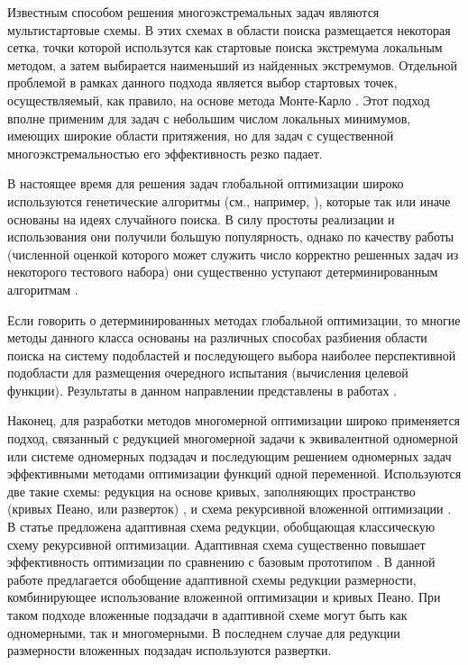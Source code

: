 \documentclass[runningheads]{llncs}
\begin{document}
\Russian
Известным способом решения многоэкстремальных задач являются мультистартовые схемы. В этих схемах в области поиска размещается некоторая сетка, точки которой использутся как стартовые поиска экстремума локальным методом, а затем выбирается наименьший из найденных экстремумов. Отдельной проблемой в рамках данного подхода является выбор стартовых точек, осуществляемый, как правило, на основе метода Монте-Карло \cite{Zhigljavsky2008}. Этот подход вполне применим для задач с небольшим числом локальных минимумов, имеющих широкие области притяжения, но для задач с существенной многоэкстремальностью его эффективность резко падает. 

В настоящее время для решения задач глобальной оптимизации широко используются генетические алгоритмы (см., например, \cite{Yang2013}), которые так или иначе основаны на идеях случайного поиска. В силу простоты реализации и использования они получили большую популярность, однако по качеству работы (численной оценкой которого может служить число корректно решенных задач из некоторого тестового набора) они существенно уступают детерминированным алгоритмам \cite{Kvasov2018,Sergeyev2018}.

Если говорить о детерминированных методах глобальной оптимизации, то многие методы данного класса основаны на различных способах разбиения области поиска на систему подобластей и последующего выбора наиболее перспективной подобласти для размещения очередного испытания (вычисления целевой функции). Результаты в данном направлении представлены в работах \cite{Zilinskas2010,Paulavicius2016,Evtushenko2013,Jones2009,Sergeyev2015}.

Наконец, для разработки методов многомерной оптимизации широко применяется подход, связанный с редукцией многомерной задачи к эквивалентной одномерной или системе одномерных подзадач и последующим решением одномерных задач эффективными методами оптимизации функций одной переменной. Используются две такие схемы: редукция на основе кривых, заполняющих пространство (кривых Пеано, или разверток) \cite{Strongin2000,Sergeyev2013}, и схема рекурсивной вложенной оптимизации \cite{Strongin2000,Grishagin2001}. В статье \cite{Grishagin2016} предложена адаптивная схема редукции, обобщающая классическую схему рекурсивной оптимизации. Адаптивная схема существенно повышает эффективность оптимизации по сравнению с базовым прототипом \cite{Grishagin2016_1}. В данной работе предлагается обобщение адаптивной схемы редукции размерности, комбинирующее использование вложенной оптимизации и кривых Пеано. При таком подходе вложенные подзадачи в адаптивной схеме могут быть как одномерными, так и многомерными. В последнем случае для редукции размерности вложенных подзадач используются развертки.
\end{document}
